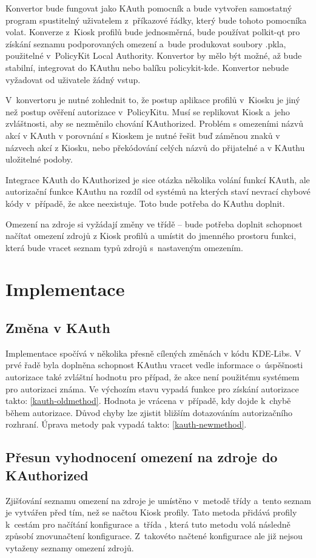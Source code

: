 Konvertor bude fungovat jako KAuth pomocník a bude vytvořen samostatný program spustitelný uživatelem z~příkazové řádky, který bude tohoto pomocníka volat. Konverze z~Kiosk profilů bude jednosměrná, bude používat polkit-qt pro získání seznamu podporovaných omezení a~bude produkovat soubory .pkla, použitelné v~PolicyKit Local Authority. Konvertor by mělo být možné, až bude stabilní, integrovat do KAuthu nebo balíku policykit-kde. Konvertor nebude vyžadovat od uživatele žádný vstup.

V~konvertoru je nutné zohlednit to, že postup aplikace profilů v~Kiosku je jiný než postup ověření autorizace v~PolicyKitu. Musí se replikovat Kiosk a~jeho zvláštnosti, aby se nezměnilo chování KAuthorized. Problém s omezeními názvů akcí v KAuth v porovnání s Kioskem je nutné řešit buď záměnou znaků v názvech akcí z Kiosku, nebo překódování celých názvů do přijatelné a v KAuthu uložitelné podoby.

Integrace KAuth do KAuthorized je sice otázka několika volání funkcí KAuth, ale autorizační funkce KAuthu na rozdíl od systémů na kterých staví nevrací chybové kódy v~případě, že akce neexistuje. Toto bude potřeba do KAuthu doplnit.

Omezení na zdroje  si vyžádají změny ve třídě  -- bude potřeba doplnit schopnost načítat omezení zdrojů z Kiosk profilů a umístit do jmenného prostoru  funkci, která bude vracet seznam typů zdrojů s~nastaveným omezením.

\section{Implementace}
\subsection*{Změna v KAuth}
Implementace spočívá v několika přesně cílených změnách v kódu KDE-Libs. V prvé řadě byla doplněna schopnost KAuthu vracet vedle informace o~úspěšnosti autorizace také zvláštní hodnotu pro případ, že akce není použitému systémem pro autorizaci známa. Ve výchozím stavu vypadá funkce pro získání autorizace takto: \ref{kauth-oldmethod}. Hodnota  je vrácena v~případě, kdy dojde k~chybě během autorizace. Důvod chyby lze zjistit bližším dotazováním autorizačního rozhraní. Úprava metody pak vypadá takto: \ref{kauth-newmethod}.

\subsection*{Přesun vyhodnocení omezení na zdroje do KAuthorized}
Zjišťování seznamu omezení na zdroje je umístěno v~metodě  třídy  a~tento seznam je vytvářen před tím, než se načtou Kiosk profily. Tato metoda přidává profily k~cestám pro načítání konfigurace a~třída , která tuto metodu volá následně způsobí znovunačtení konfigurace. Z~takovéto načtené konfigurace ale již nejsou vytaženy seznamy omezení zdrojů.

